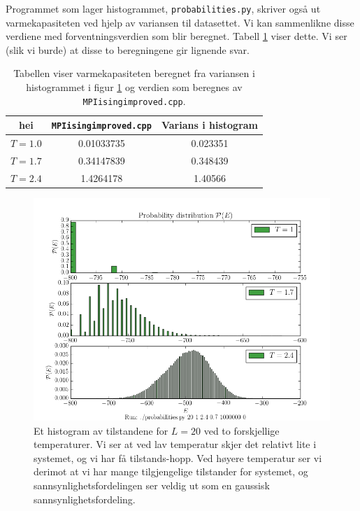 \documentclass[11pt]{article}
\begin{document}
Programmet som lager histogrammet, \texttt{probabilities.py}, skriver
også ut varmekapasiteten ved hjelp av variansen til datasettet. Vi kan
sammenlikne disse verdiene med forventningsverdien som blir
beregnet. Tabell \ref{tab:var-vs-Cv} viser dette. Vi ser (slik vi
burde) at disse to beregningene gir lignende svar. 

\begin{table}
\centering
\caption{Tabellen viser varmekapasiteten beregnet fra variansen i
  histogrammet i figur \ref{fig:probabilities} og verdien som beregnes
av \texttt{MPIisingimproved.cpp}.}
\label{tab:var-vs-Cv}
\vspace{0.1cm}
\begin{tabular}{c|cc}
hei &\texttt{MPIisingimproved.cpp} & Varians i histogram\\
\hline
$T=1.0$ & 0.01033735  & 0.023351\\
$T=1.7$ & 0.34147839  & 0.348439 \\
$T=2.4$ & 1.4264178 & 1.40566
\end{tabular}
\end{table}

\begin{figure}[ht]
  \centering
  \includegraphics[scale=0.7]{../fig/prob_E.png}
  \caption{Et histogram av tilstandene for $L=20$ ved to 
forskjellige temperaturer. Vi ser at ved lav temperatur
skjer det relativt lite i systemet, og vi har få tilstands-hopp. Ved høyere temperatur ser vi derimot at vi har mange tilgjengelige tilstander for systemet, og 
sannsynlighetsfordelingen ser veldig ut som en gaussisk sannsynlighetsfordeling.}
\label{fig:probabilities}
\end{figure}
\end{document}
